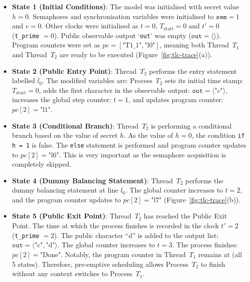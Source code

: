 \documentclass[a4paper,12pt]{report}
\begin{document}
\begin{itemize}[itemsep=0.25em, topsep=0.2em]
    \item \textbf{State 1 (Initial Conditions)}: The model was initialised with secret value $h = 0$. Semaphores and synchronisation variables were initialised to $\texttt{sem} = 1$ and $v = 0$. Other clocks were initialised as $t = 0$, $T_{\text{start}} = 0$ and $t' = 0$ (\texttt{t\_prime} $= 0$). Public observable output `\texttt{out}' was empty ($\texttt{out} = \langle \rangle$). Program counters were set as $pc = [\text{"T1\_1"}, \text{"l0"}]$, meaning both Thread~$T_1$ and Thread~$T_2$ are ready to be executed (Figure~\ref{fig:tlc-trace}(a)).
    
    \item \textbf{State 2 (Public Entry Point)}: Thread~$T_2$ performs the entry statement labelled $l_0$. The modified variables are: Process~$T_2$ sets its initial time stamp: $T_{\text{start}} = 0$, adds the first character in the observable output: $\texttt{out} = \langle \text{"c"} \rangle$, increases the global step counter: $t = 1$, and updates program counter: $pc[2] = \text{"l1"}$.
    
    \item \textbf{State 3 (Conditional Branch)}: Thread~$T_2$ is performing a conditional branch based on the value of secret $h$. As the value of $h = 0$, the condition \texttt{if h = 1} is false. The \texttt{else} statement is performed and program counter updates to $pc[2] = \text{"l6"}$. This is very important as the semaphore acquisition is completely skipped.
    
    \item \textbf{State 4 (Dummy Balancing Statement)}: Thread~$T_2$ performs the dummy balancing statement at line $l_6$. The global counter increases to $t = 2$, and the program counter updates to $pc[2] = \text{"l7"}$ (Figure~\ref{fig:tlc-trace}(b)).
    
    \item \textbf{State 5 (Public Exit Point)}: Thread~$T_2$ has reached the Public Exit Point. The time at which the process finishes is recorded in the clock $t' = 2$ (\texttt{t\_prime} $= 2$). The public character ``d'' is added to the output list: $\texttt{out} = \langle \text{"c"}, \text{"d"} \rangle$. The global counter increases to $t = 3$. The process finishes: $pc[2] = \text{"Done"}$. Notably, the program counter in Thread~$T_1$ remains at  (all 5 states). Therefore, pre-emptive scheduling allows Process~$T_2$ to finish without any context switches to Process~$T_1$.
\end{itemize}
\end{document}
